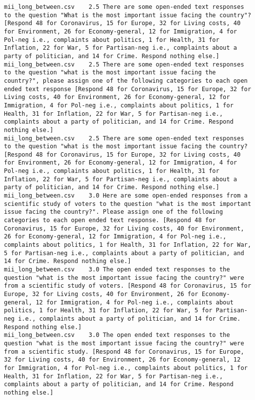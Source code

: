 \begin{lstlisting}[label=lst:promptvariants]
mii_long_between.csv	2.5	There are some open-ended text responses to the question "What is the most important issue facing the country"? [Respond 48 for Coronavirus, 15 for Europe, 32 for Living costs, 40 for Environment, 26 for Economy-general, 12 for Immigration, 4 for Pol-neg i.e., complaints about politics, 1 for Health, 31 for Inflation, 22 for War, 5 for Partisan-neg i.e., complaints about a party of politician, and 14 for Crime. Respond nothing else.]
mii_long_between.csv	2.5	There are some open-ended text responses to the question "what is the most important issue facing the country?", please assign one of the following categories to each open ended text response [Respond 48 for Coronavirus, 15 for Europe, 32 for Living costs, 40 for Environment, 26 for Economy-general, 12 for Immigration, 4 for Pol-neg i.e., complaints about politics, 1 for Health, 31 for Inflation, 22 for War, 5 for Partisan-neg i.e., complaints about a party of politician, and 14 for Crime. Respond nothing else.]
mii_long_between.csv	2.5	There are some open-ended text responses to the question "what is the most important issue facing the country? [Respond 48 for Coronavirus, 15 for Europe, 32 for Living costs, 40 for Environment, 26 for Economy-general, 12 for Immigration, 4 for Pol-neg i.e., complaints about politics, 1 for Health, 31 for Inflation, 22 for War, 5 for Partisan-neg i.e., complaints about a party of politician, and 14 for Crime. Respond nothing else.]
mii_long_between.csv	3.0	Here are some open-ended responses from a scientific study of voters to the question "what is the most important issue facing the country?". Please assign one of the following categories to each open ended text response. [Respond 48 for Coronavirus, 15 for Europe, 32 for Living costs, 40 for Environment, 26 for Economy-general, 12 for Immigration, 4 for Pol-neg i.e., complaints about politics, 1 for Health, 31 for Inflation, 22 for War, 5 for Partisan-neg i.e., complaints about a party of politician, and 14 for Crime. Respond nothing else.]
mii_long_between.csv	3.0	The open ended text responses to the question "what is the most important issue facing the country?" were from a scientific study of voters. [Respond 48 for Coronavirus, 15 for Europe, 32 for Living costs, 40 for Environment, 26 for Economy-general, 12 for Immigration, 4 for Pol-neg i.e., complaints about politics, 1 for Health, 31 for Inflation, 22 for War, 5 for Partisan-neg i.e., complaints about a party of politician, and 14 for Crime. Respond nothing else.]
mii_long_between.csv	3.0	The open ended text responses to the question "what is the most important issue facing the country?" were from a scientific study. [Respond 48 for Coronavirus, 15 for Europe, 32 for Living costs, 40 for Environment, 26 for Economy-general, 12 for Immigration, 4 for Pol-neg i.e., complaints about politics, 1 for Health, 31 for Inflation, 22 for War, 5 for Partisan-neg i.e., complaints about a party of politician, and 14 for Crime. Respond nothing else.]

\end{lstlisting}
